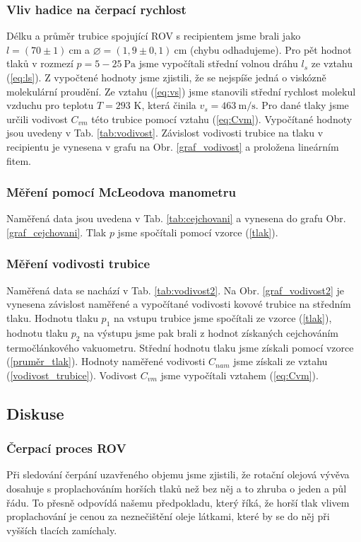 \documentclass[english]{article}
\newcommand{\unit}[1]{\mathrm{#1}}
\begin{document}
	\subsubsection{Vliv hadice na čerpací rychlost}
	Délku a průměr trubice spojující ROV s recipientem jsme brali jako $ l = (70\pm 1)~\unit{cm}$ a $ \diameter = (1,9 \pm 0,1)~\unit{cm}$ (chybu odhadujeme). Pro pět hodnot tlaků v rozmezí $ p = 5 - 25~\unit{Pa}$ jsme vypočítali střední volnou dráhu $l_s$ ze vztahu (\ref{eq:ls}). Z vypočtené hodnoty jsme zjistili, že se nejspíše jedná o viskózně molekulární proudění. Ze vztahu (\ref{eq:vs}) jsme stanovili střední rychlost molekul vzduchu pro teplotu $ T = 293 $ K, která činila $ v_s = 463~\unit{m/s}$. Pro dané tlaky jsme určili vodivost $C_{vm}$ této trubice pomocí vztahu (\ref{eq:Cvm}). Vypočítané hodnoty jsou uvedeny v Tab. \ref{tab:vodivost}. Závislost vodivosti trubice na tlaku v recipientu je vynesena v grafu na Obr. \ref{graf_vodivost} a proložena lineárním fitem. 
	
	\subsubsection{Měření pomocí McLeodova manometru}
	Naměřená data jsou uvedena v Tab. \ref{tab:cejchovani} a vynesena do grafu Obr. \ref{graf_cejchovani}. Tlak $ p $ jsme spočítali pomocí vzorce (\ref{tlak}).
	
	\subsubsection{Měření vodivosti trubice}
	Naměřená data se nachází v Tab. \ref{tab:vodivost2}. Na Obr. \ref{graf_vodivost2} je vynesena závislost naměřené a vypočítané vodivosti kovové trubice na středním tlaku. Hodnotu tlaku $p_1$ na vstupu trubice jsme spočítali ze vzorce (\ref{tlak}), hodnotu tlaku $p_2$ na výstupu jsme pak brali z hodnot získaných cejchováním termočlánkového vakuometru. Střední hodnotu tlaku jsme získali pomocí vzorce (\ref{pruměr_tlak}). Hodnoty naměřené vodivosti $C_{nam}$ jsme získali ze vztahu (\ref{vodivost_trubice}). Vodivost $C_{vm}$ jsme vypočítali vztahem (\ref{eq:Cvm}).

			
\subsection{Diskuse}
	\subsubsection{Čerpací proces ROV}
		Při sledování čerpání uzavřeného objemu jsme zjistili, že rotační olejová vývěva dosahuje s proplachováním horších tlaků než bez něj a to zhruba o jeden a půl řádu. To přesně odpovídá našemu předpokladu, který říká, že horší tlak vlivem proplachování je cenou za neznečištění oleje látkami, které by se do něj při vyšších tlacích zamíchaly. 
		
\end{document}
